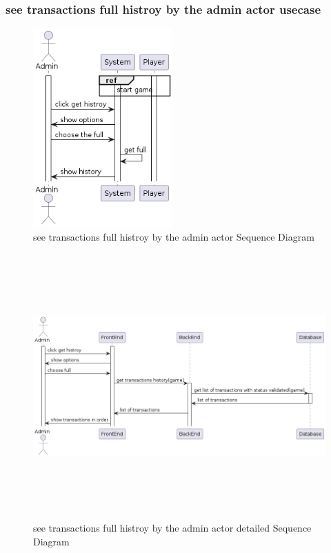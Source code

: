\documentclass{article}
\begin{document}
\subsubsection{see transactions full histroy by the admin actor usecase}
\begin{figure}[H]
	\centering
	\includegraphics[height=3in]{../thesis_tex/assets/diagrams/see_transactions_full_history_SD.png}
	\caption{see transactions full histroy by the admin actor Sequence Diagram}
\end{figure}

\begin{figure}[H]
	\centering
	\includegraphics[height=4in,width=6in]{../thesis_tex/assets/diagrams/see_transactions_full_history_detailedSD.png}
	\caption{see transactions full histroy by the admin actor detailed Sequence Diagram}
\end{figure}
\end{document}

